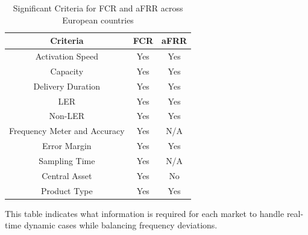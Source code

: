 \begin{table}[htbp]
    \centering
    \begin{tabular}{|c|c|c|}
        \hline
        \textbf{Criteria} & \textbf{FCR} & \textbf{aFRR} \\
        \hline
        Activation Speed & Yes & Yes \\
        \hline
        Capacity & Yes & Yes \\
        \hline   
        Delivery Duration & Yes & Yes \\
        \hline  
        LER & Yes & Yes \\
        \hline
        Non-LER & Yes & Yes \\
        \hline
        Frequency Meter and Accuracy & Yes & N/A \\
        \hline
        Error Margin & Yes & Yes \\
        \hline
        Sampling Time & Yes & N/A \\
        \hline
        Central Asset & Yes & No \\
        \hline  
        Product Type & Yes & Yes \\
        \hline 
    \end{tabular}
    \caption{Significant Criteria for FCR and aFRR across European countries}
    \label{tab:criteria2}
\end{table}

This table indicates what information is required for each market to handle real-time dynamic cases while balancing frequency deviations.



